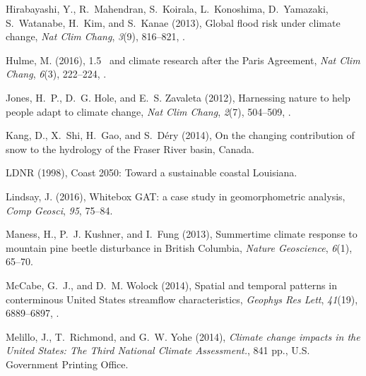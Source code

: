 \documentclass[draft,linenumbers]{AGUJournal}
\begin{document}
\begin{thebibliography}{38}
Hirabayashi, Y., R.~Mahendran, S.~Koirala, L.~Konoshima, D.~Yamazaki,
  S.~Watanabe, H.~Kim, and S.~Kanae (2013), Global flood risk under climate
  change, \textit{Nat Clim Chang}, \textit{3}(9), 816--821,
  .

Hulme, M. (2016), 1.5\celsius~ and climate research after the {Paris
  Agreement}, \textit{Nat Clim Chang}, \textit{6}(3), 222--224,
  .

Jones, H.~P., D.~G. Hole, and E.~S. Zavaleta (2012), Harnessing nature to help
  people adapt to climate change, \textit{Nat Clim Chang}, \textit{2}(7),
  504--509, .

Kang, D., X.~Shi, H.~Gao, and S.~D{\'e}ry (2014), On the changing contribution
  of snow to the hydrology of the {F}raser {R}iver basin, {C}anada.

LDNR (1998), Coast 2050: Toward a sustainable coastal {L}ouisiana.

Lindsay, J. (2016), Whitebox {GAT:} a case study in geomorphometric analysis,
  \textit{Comp Geosci}, \textit{95}, 75--84.

Maness, H., P.~J. Kushner, and I.~Fung (2013), Summertime climate response to
  mountain pine beetle disturbance in {B}ritish {C}olumbia, \textit{Nature
  Geoscience}, \textit{6}(1), 65--70.

{McCabe}, G.~J., and D.~M. Wolock (2014), Spatial and temporal patterns in
  conterminous {U}nited {S}tates streamflow characteristics, \textit{Geophys Res
  Lett}, \textit{41}(19), 6889--6897, .

Melillo, J., T.~Richmond, and G.~W. Yohe (2014), \textit{Climate change impacts
  in the {U}nited {S}tates: The Third National Climate Assessment.}, 841 pp.,
  {U.S.} Government Printing Office.


\end{thebibliography}
\end{document}

